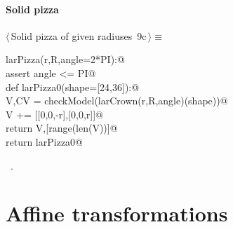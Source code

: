 \documentclass[11pt,oneside]{article}	%
\begin{document}
\paragraph{Solid pizza}
\begin{flushleft} \small \label{scrap19}
\protect{}$\langle\,$Solid pizza of given radiuses\nobreak\ {\footnotesize 9c}$\,\rangle\equiv$
\vspace{-1ex}
\begin{list}{}{} \item
\mbox{}\verb@def larPizza(r,R,angle=2*PI):@\\
\mbox{}\verb@   assert angle <= PI@\\
\mbox{}\verb@   def larPizza0(shape=[24,36]):@\\
\mbox{}\verb@      V,CV = checkModel(larCrown(r,R,angle)(shape))@\\
\mbox{}\verb@      V += [[0,0,-r],[0,0,r]]@\\
\mbox{}\verb@      return V,[range(len(V))]@\\
\mbox{}\verb@   return larPizza0@\\
\mbox{}\verb@@{\NWsep}
\end{list}
\vspace{-1ex}
\footnotesize\addtolength{\baselineskip}{-1ex}
\begin{list}{}{\setlength{\itemsep}{-\parsep}\setlength{\itemindent}{-\leftmargin}}
\item \NWtxtMacroRefIn\ .
\end{list}
\end{flushleft}
\section{Affine transformations}
\end{document}
